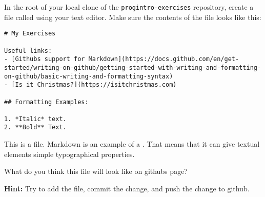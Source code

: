In the root of your local clone of the \texttt{progintro-exercises} repository, create a file called  using your text editor. Make sure the contents of the file looks like this:

\begin{verbatim}
# My Exercises

Useful links:
- [Githubs support for Markdown](https://docs.github.com/en/get-started/writing-on-github/getting-started-with-writing-and-formatting-on-github/basic-writing-and-formatting-syntax)
- [Is it Christmas?](https://isitchristmas.com)

## Formatting Examples:

1. *Italic* text.
2. **Bold** Text.
\end{verbatim}

This is a  file. Markdown is an example of a . That means that it can give textual elements simple typographical properties.


What do you think this file will look like on githubs page?

\textbf{Hint:} Try to add the file, commit the change, and push the change to github.

